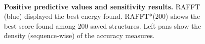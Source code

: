 \begin{figure}[t!]
	\centering
	\\
	\caption{\textbf{Positive predictive values and sensitivity results\label{app:perf_fig}.}
		RAFFT (blue) displayed the best energy found. RAFFT*(200) shows the best score found among 200 saved structures. Left pans show the density (sequence-wise) of the accuracy measures.}
\end{figure}

